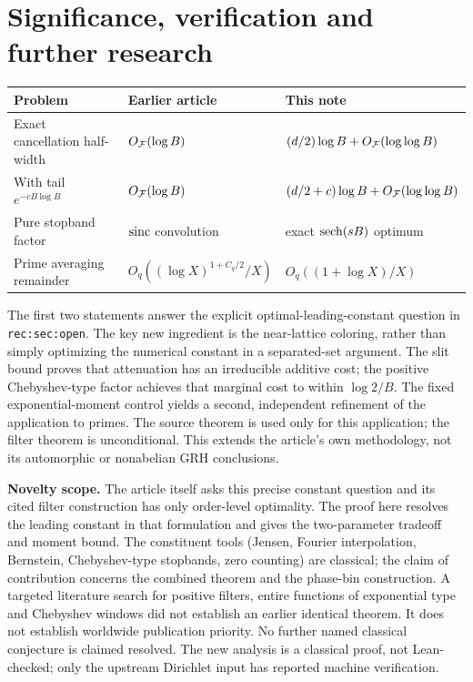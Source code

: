 \documentclass[11pt]{article}
\theoremstyle{definition}\newtheorem{definition}[theorem]{Definition}
\begin{document}
\section{Significance, verification and further research}
\begin{center}
\begin{tabular}{@{}lll@{}}\toprule
Problem & Earlier article & This note\\\midrule
Exact cancellation half-width & $O_{\mathcal F}(\log B)$ & $(d/2)\log B+O_{\mathcal F}(\log\log B)$\\
With tail $e^{-c B\log B}$ & $O_{\mathcal F}(\log B)$ & $(d/2+c)\log B+O_{\mathcal F}(\log\log B)$\\
Pure stopband factor & $\operatorname{sinc}$ convolution & exact $\operatorname{sech}(sB)$ optimum\\
Prime averaging remainder & $O_q((\log X)^{1+C_q/2}/X)$ & $O_q((1+\log X)/X)$\\\bottomrule
\end{tabular}
\end{center}
The first two statements answer the explicit optimal-leading-constant question in \texttt{rec:sec:open}. The key new ingredient is the near-lattice coloring, rather than simply optimizing the numerical constant in a separated-set argument. The slit bound proves that attenuation has an irreducible additive cost; the positive Chebyshev-type factor achieves that marginal cost to within $\log2/B$. The fixed exponential-moment control yields a second, independent refinement of the application to primes. The source theorem is used only for this application; the filter theorem is unconditional. This extends the article's own methodology, not its automorphic or nonabelian GRH conclusions.

\textbf{Novelty scope.} The article itself asks this precise constant question and its cited filter construction has only order-level optimality. The proof here resolves the leading constant in that formulation and gives the two-parameter tradeoff and moment bound. The constituent tools (Jensen, Fourier interpolation, Bernstein, Chebyshev-type stopbands, zero counting) are classical; the claim of contribution concerns the combined theorem and the phase-bin construction. A targeted literature search for positive filters, entire functions of exponential type and Chebyshev windows did not establish an earlier identical theorem. It does not establish worldwide publication priority. No further named classical conjecture is claimed resolved. The new analysis is a classical proof, not Lean-checked; only the upstream Dirichlet input has reported machine verification.
\end{document}
